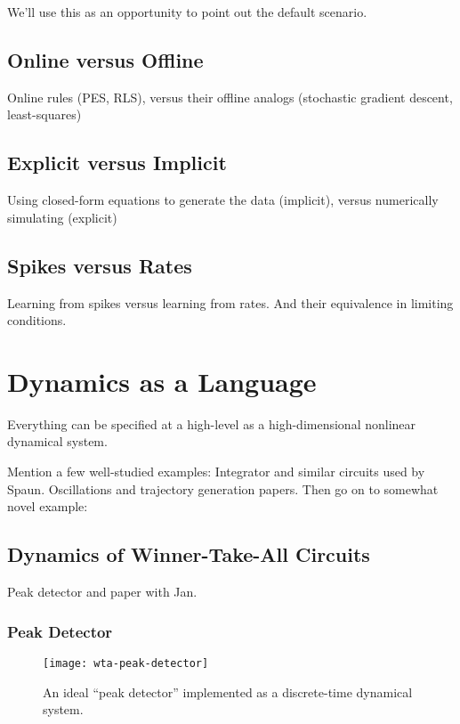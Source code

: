We'll use this as an opportunity to point out the default scenario.

\subsection{Online versus Offline}

Online rules (PES, RLS), versus their offline analogs (stochastic gradient descent, least-squares)

\subsection{Explicit versus Implicit}

Using closed-form equations to generate the data (implicit), versus numerically simulating (explicit)

\subsection{Spikes versus Rates}

Learning from spikes versus learning from rates. And their equivalence in limiting conditions.

\section{Dynamics as a Language}

Everything can be specified at a high-level as a high-dimensional nonlinear dynamical system.

Mention a few well-studied examples:
Integrator and similar circuits used by Spaun.
Oscillations and trajectory generation papers.
Then go on to somewhat novel example:

\subsection{Dynamics of Winner-Take-All Circuits}

Peak detector and paper with Jan.

\subsubsection{Peak Detector}

\begin{figure}
\centering
\texttt{[image: wta-peak-detector]}
\caption{ \label{fig:wta-peak-detector}
  An ideal ``peak detector'' implemented as a discrete-time dynamical system.
}
\end{figure}

